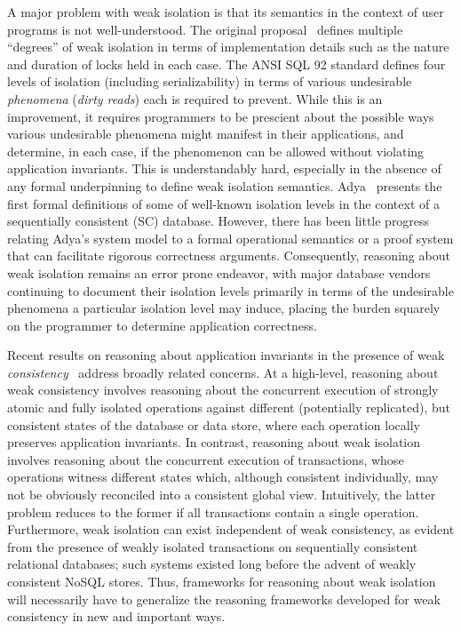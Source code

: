 A major problem with weak isolation is that its semantics in the
context of user programs is not well-understood. The original
proposal~\cite{gray1976} defines multiple ``degrees'' of weak
isolation in terms of implementation details such as the nature and
duration of locks held in each case. The ANSI SQL 92 standard defines
four levels of isolation (including serializability) in terms of
various undesirable \emph{phenomena} (\eg \emph{dirty reads}) each is
required to prevent. While this is an improvement, it requires
programmers to be prescient about the possible ways various
undesirable phenomena might manifest in their applications, and
determine, in each case, if the phenomenon can be allowed without
violating application invariants. This is understandably hard,
especially in the absence of any formal underpinning to define weak
isolation semantics.  Adya~\cite{adyaphd} presents the first formal
definitions of some of well-known isolation levels in the context of a
sequentially consistent (SC) database.  However, there has been little
progress relating Adya's system model to a formal operational
semantics or a proof system that can facilitate rigorous correctness
arguments.  Consequently, reasoning about weak isolation remains an
error prone endeavor, with major database vendors~\cite{postgresiso,
mysqliso, oracleiso} continuing to document their isolation levels
primarily in terms of the undesirable phenomena a particular isolation
level may induce, placing the burden squarely on the programmer to
determine application correctness.

Recent results on reasoning about application invariants in the
presence of weak \emph{consistency}~\cite{burckhardt14, redblueosdi,
  redblueatc, ecinec, gotsmanpopl16} address broadly related concerns.
At a high-level, reasoning about weak consistency involves reasoning
about the concurrent execution of strongly atomic and fully isolated
operations against different (potentially replicated), but consistent
states of the database or data store, where each operation locally
preserves application invariants. In contrast, reasoning about weak
isolation involves reasoning about the concurrent execution of
transactions, whose operations witness different states which,
although consistent individually, may not be obviously reconciled into
a consistent global view.  Intuitively, the latter problem reduces to
the former if all transactions contain a single
operation. Furthermore, weak isolation can exist independent of weak
consistency, as evident from the presence of weakly isolated
transactions on sequentially consistent relational databases; such
systems existed long before the advent of weakly consistent NoSQL
stores.  Thus, frameworks for reasoning about weak isolation will
necessarily have to generalize the reasoning frameworks developed for
weak consistency in new and important ways.

